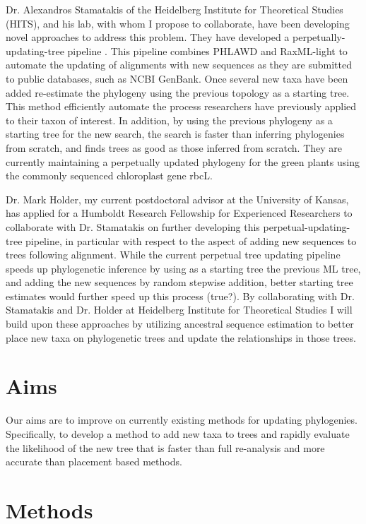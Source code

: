 \documentclass[10pt]{article}
\begin{document}
Dr. 
Alexandros Stamatakis of the Heidelberg Institute for Theoretical Studies (HITS), and his lab, with whom I propose to collaborate, have been developing novel approaches to address this problem. 
They have developed a perpetually-updating-tree pipeline \cite{izquierdo-carrasco_perpetual_????}. 
This pipeline combines PHLAWD \cite{smith_mega-phylogeny_2009} and RaxML-light \cite{stamatakis_RAxML-Light:_2012} to automate the updating of alignments with new sequences as they are submitted to public databases, such as NCBI GenBank. 
Once several new taxa have been added re-estimate the phylogeny using the previous topology as a starting tree. 
This method efficiently automate the process researchers have previously applied to their taxon of interest. 
In addition, by using the previous phylogeny as a starting tree for the new search, the search is faster than inferring phylogenies from scratch, and finds trees as good as those inferred from scratch. 
They  are currently maintaining a perpetually updated phylogeny for the green plants using the commonly sequenced chloroplast gene rbcL.

Dr. 
Mark Holder, my current postdoctoral advisor at the University of Kansas, has applied for a Humboldt Research Fellowship for Experienced Researchers to collaborate with Dr. 
Stamatakis on further developing this perpetual-updating-tree pipeline, in particular with respect to the aspect of adding new sequences to trees following alignment. 
While the current perpetual tree updating pipeline speeds up phylogenetic inference by using as a starting tree the previous ML tree, and adding the new sequences by random stepwise addition, better starting tree estimates would further speed up this process (true?).
By collaborating with Dr. 
Stamatakis and Dr. 
Holder at Heidelberg Institute for Theoretical Studies I will build upon these approaches by utilizing ancestral sequence estimation to better place new taxa on phylogenetic trees and update the relationships in those trees.


\section*{Aims}
Our aims are to improve on currently existing methods for updating phylogenies. 
Specifically, to develop a method to add new taxa to trees and rapidly evaluate the likelihood of the new tree that is faster than full re-analysis and more accurate than placement based methods.
 
\section*{Methods}
\end{document}
